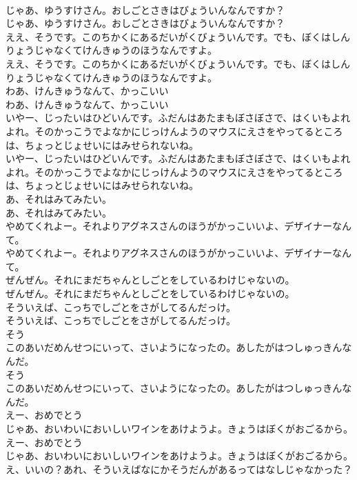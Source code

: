 \documentclass[8pt]{extreport}
\begin{document}
\begin{CJK}{UTF8}{min}
\\	じゃあ、ゆうすけさん。おしごとさきはびょういんなんですか？
\\	じゃあ、ゆうすけさん。おしごとさきはびょういんなんですか？
\\	ええ、そうです。このちかくにあるだいがくびょういんです。でも、ぼくはしんりょうじゃなくてけんきゅうのほうなんですよ。
\\	ええ、そうです。このちかくにあるだいがくびょういんです。でも、ぼくはしんりょうじゃなくてけんきゅうのほうなんですよ。
\\	わあ、けんきゅうなんて、かっこいい
\\	わあ、けんきゅうなんて、かっこいい
\\	いやー、じったいはひどいんです。ふだんはあたまもぼさぼさで、はくいもよれよれ。そのかっこうでよなかにじっけんようのマウスにえさをやってるところは、ちょっとじょせいにはみせられないね。
\\	いやー、じったいはひどいんです。ふだんはあたまもぼさぼさで、はくいもよれよれ。そのかっこうでよなかにじっけんようのマウスにえさをやってるところは、ちょっとじょせいにはみせられないね。
\\	あ、それはみてみたい。
\\	あ、それはみてみたい。
\\	やめてくれよー。それよりアグネスさんのほうがかっこいいよ、デザイナーなんて。
\\	やめてくれよー。それよりアグネスさんのほうがかっこいいよ、デザイナーなんて。
\\	ぜんぜん。それにまだちゃんとしごとをしているわけじゃないの。
\\	ぜんぜん。それにまだちゃんとしごとをしているわけじゃないの。
\\	そういえば、こっちでしごとをさがしてるんだっけ。
\\	そういえば、こっちでしごとをさがしてるんだっけ。
\\	そう
\\	このあいだめんせつにいって、さいようになったの。あしたがはつしゅっきんなんだ。
\\	そう
\\	このあいだめんせつにいって、さいようになったの。あしたがはつしゅっきんなんだ。
\\	えー、おめでとう
\\	じゃあ、おいわいにおいしいワインをあけようよ。きょうはぼくがおごるから。
\\	えー、おめでとう
\\	じゃあ、おいわいにおいしいワインをあけようよ。きょうはぼくがおごるから。
\\	え、いいの？あれ、そういえばなにかそうだんがあるってはなしじゃなかった？

\end{CJK}
\end{document}
